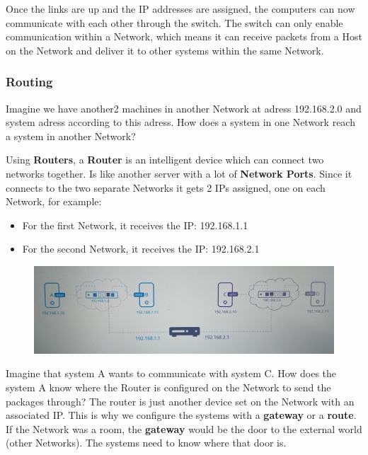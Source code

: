 \documentclass{article}
\begin{document}
Once the links are up and the IP addresses are assigned, the computers can now communicate with each other through the switch. The switch can only enable communication within a Network, which means it can receive packets from a Host on the Network and deliver it to other systems within the same Network.

\subsubsection{Routing}

Imagine we have another2 machines in another Network at adress 192.168.2.0 and system adress according to this adress. How does a system in one Network reach a system in another Network?

Using \textbf{Routers}, a \textbf{Router} is an intelligent device which can connect two networks together. Is like another server with a lot of \textbf{Network Ports}. Since it connects to the two separate Networks it gets 2 IPs assigned, one on each Network, for example:

\begin{itemize}
    \item For the first Network, it receives the IP: 192.168.1.1
    \item For the second Network, it receives the IP: 192.168.2.1
\end{itemize}

\begin{figure}[H]
    \includegraphics[width=\textwidth]{pictures/ntw4.png}
\end{figure}

Imagine that system A wants to communicate with system C. How does the system A know where the Router is configured on the Network to send the packages through? The router is just another device set on the Network with an associated IP. This is why we configure the systems with a \textbf{gateway} or a \textbf{route}. If the Network was a room, the \textbf{gateway} would be the door to the external world (other Networks). The systems need to know where that door is. 
\end{document}
